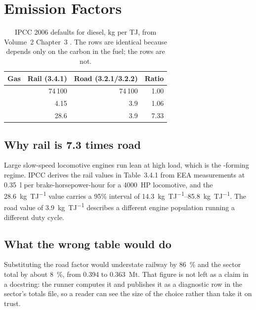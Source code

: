 \section{Emission Factors}
\label{sec:factors}

\begin{table}[htbp]
\centering
\footnotesize
\begin{tabular}{@{}lrrr@{}}
\toprule
\textbf{Gas} & \textbf{Rail (3.4.1)} & \textbf{Road (3.2.1/3.2.2)} & \textbf{Ratio} \\
\midrule
\COtwo{}  & 74\,100 & 74\,100 & 1.00 \\
\CHfour{} &    4.15 &     3.9 & 1.06 \\
\NtwoO{}  &    28.6 &     3.9 & 7.33 \\
\bottomrule
\end{tabular}
\caption{IPCC 2006 defaults for diesel, kg per TJ, from Volume~2 Chapter~3
\citep{ipcc2006energy}. The \COtwo{} rows are identical because \COtwo{} depends only on the
carbon in the fuel; the \NtwoO{} rows are not.}
\label{tab:factors}
\end{table}

\subsection{Why rail \NtwoO{} is \num{7.3} times road}

Large slow-speed locomotive engines run lean at high load, which is the \NtwoO{}-forming
regime. IPCC derives the rail values in Table~3.4.1 from EEA measurements at
\SI{0.35}{\litre} per brake-horsepower-hour for a \SI{4000}{HP} locomotive, and the
\SI{28.6}{\kilo\gram\per\tera\joule} value carries a 95\% interval of
\SIrange{14.3}{85.8}{\kilo\gram\per\tera\joule}. The road value of
\SI{3.9}{\kilo\gram\per\tera\joule} describes a different engine population running a different
duty cycle.

\subsection{What the wrong table would do}

Substituting the road \NtwoO{} factor would understate railway \NtwoO{} by \SI{86}{\percent}
and the sector total by about \SI{8}{\percent}, from \SI{0.394}{} to
\SI{0.363}{\mega\tonne}. That figure is not left as a claim in a docstring: the runner computes
it and publishes it as a diagnostic row in the sector's totals file, so a reader can see the
size of the choice rather than take it on trust.

